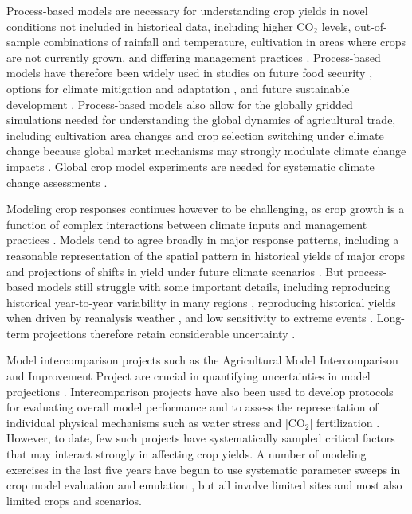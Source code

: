 \documentclass[gmd, manuscript]{copernicus} %
\begin{document}
Process-based models are necessary for understanding crop yields in novel conditions not included in historical data, including higher CO$_2$ levels, out-of-sample combinations of rainfall and temperature, cultivation in areas where crops are not currently grown, and differing management practices \citep[e.g.][]{pugh_climate_2016, Roberts2017,minoli2019modelling}. Process-based models have therefore been widely used in studies on future food security \citep{wheeler2013climate, Elliott14, frieler2017assessing}, options for climate mitigation \citep{muller2015} and adaptation \citep{challinor2018improving}, and future sustainable development \citep{humpenoder2018large, jagermeyr_reconciling_2017}.
Process-based models also allow for the globally gridded simulations needed for understanding the global dynamics of agricultural trade, including cultivation area changes and crop selection switching under climate change \citep{rosenzweig2018,ruane2018} because global market mechanisms may strongly modulate climate change impacts \citep{Stevanovic2016,hasegawa2018risk}. 
Global crop model experiments are needed for systematic climate change assessments \citep{muller_global_2017}.

Modeling crop responses continues however to be challenging, as crop growth is a function of complex interactions between climate inputs and management practices \citep{Boote13,rotter2011}. 
Models tend to agree broadly in major response patterns, including a reasonable representation of the spatial pattern in historical yields of major crops and projections of shifts in yield under future climate scenarios \citep[e.g.][]{Elliott2015, muller_global_2017}. 
But process-based models still struggle with some important details, including reproducing historical year-to-year variability in many regions \citep[e.g.][]{muller_global_2017, Jag2018}, reproducing historical yields when driven by reanalysis weather \citep[e.g.][]{Glotter14}, and low sensitivity to extreme events \citep[e.g.][]{Glotter15,schewe2019}. 
Long-term projections therefore retain considerable uncertainty \citep{WOLF2002217, JAGTAP200273, Iizumi2010, ANGULO201332, Asseng2013, Asseng2015}. 

Model intercomparison projects such as the Agricultural Model Intercomparison and Improvement Project \citep[AgMIP, ][]{ROSENZWEIG2013} are crucial in quantifying uncertainties in model projections \citep{Rosenzweig2014}. Intercomparison projects have also been used to develop protocols for evaluating overall model performance \citep{Elliott2015, muller_global_2017} and to assess the representation of individual physical mechanisms such as water stress and [CO$_2$] fertilization \citep[e.g.][]{Schauberger2017}.
However, to date, few such projects have systematically sampled critical factors that may interact strongly in affecting crop yields. A number of modeling exercises in the last five years have begun to use
systematic parameter sweeps in crop model evaluation and emulation  \citep[e.g.][]{ruane2014, Markowski2015, Pirttioja2015,FRONZEK20182, Snyder2018, RUIZRAMOS2018}, but all involve limited sites and most also limited crops and scenarios. 
\end{document}
